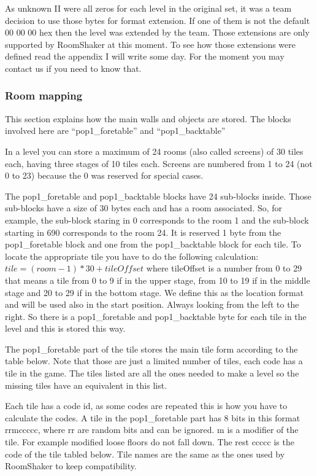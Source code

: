 \documentclass{article}
\begin{document}
 As unknown II were all zeros for each level in the original set, it was a
 team decision to use those bytes for format extension. If one of them is
 not the default 00 00 00 hex then the level was extended by the team.
 Those extensions are only supported by RoomShaker at this  moment. To see
 how those extensions were defined read the appendix I will write some day.
 For the moment you may contact us if you need to know that.

\subsubsection{Room mapping\label{room mapping}} %
 This section explains how the main walls and objects are stored. The
 blocks involved here are ``pop1\_foretable'' and ``pop1\_backtable''

 In a level you can store a maximum of 24 rooms (also called screens) of 30
 tiles each, having three stages of 10 tiles each. Screens are numbered
 from 1 to 24 (not 0 to 23) because the 0 was reserved for special cases.

 The pop1\_foretable and pop1\_backtable blocks have 24 sub-blocks inside.
 Those sub-blocks have a size of 30 bytes each and has a room associated.
 So, for example, the sub-block staring in 0 corresponds to the room 1 and
 the sub-block starting in 690 corresponds to the room 24.
 It is reserved 1 byte from the pop1\_foretable block and one from the
 pop1\_backtable block for each tile. To locate the appropriate tile you
 have to do the following calculation: $tile=(room-1)*30+tileOffset$ where
 tileOffset is a number from 0 to 29 that means a tile from 0 to 9 if in
 the upper stage, from 10 to 19 if in the middle stage and 20 to 29 if in
 the bottom stage. We define this as the location format and will be used
 also in the start position.
 Always looking from the left to the right.
 So there is a pop1\_foretable and pop1\_backtable byte for each tile in the
 level and this is stored this way.

 The pop1\_foretable part of the tile stores the main tile form according to
 the table below. Note that those are just a limited number of tiles, each
 code has a tile in the game. The tiles listed are all the ones needed to
 make a level so the missing tiles have an equivalent in this list.

 Each tile has a code id, as some codes are repeated this is how you have
 to calculate the codes. A tile in the pop1\_foretable part has 8 bits in
 this format rrmccccc, where rr are random bits and can be ignored. m is a
 modifier of the tile. For example modified loose floors do not fall down.
 The rest ccccc is the code of the tile tabled below. Tile names are the
 same as the ones used by RoomShaker to keep compatibility.
\end{document}
